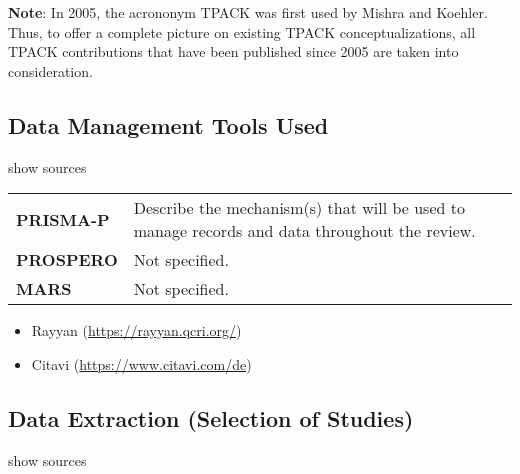 \documentclass[
]{article}
\providecommand{\tightlist}{%
  \setlength{\itemsep}{0pt}\setlength{\parskip}{0pt}}
\begin{document}
\textbf{Note}: In 2005, the acrononym TPACK was first used by Mishra and
Koehler. Thus, to offer a complete picture on existing TPACK
conceptualizations, all TPACK contributions that have been published
since 2005 are taken into consideration.

\hypertarget{data-management-tools-used}{%
\subsection{Data Management Tools
Used}\label{data-management-tools-used}}

show sources

\hypertarget{dmtu}{}
\begin{collapse}

\begin{table}[H]
\centering
\begin{tabular}{>{}l|l}
\hline
\cellcolor[HTML]{ececec}{source} & \cellcolor[HTML]{ececec}{description}\\
\hline
\textbf{PRISMA-P} & Describe the mechanism(s) that will be used to manage records and data throughout the review.\\
\hline
\textbf{PROSPERO} & Not specified.\\
\hline
\textbf{MARS} & Not specified.\\
\hline
\end{tabular}
\end{table}

\end{collapse}

\begin{itemize}
\tightlist
\item
  Rayyan (\url{https://rayyan.qcri.org/})
\item
  Citavi (\url{https://www.citavi.com/de})
\end{itemize}

\hypertarget{data-extraction-selection-of-studies}{%
\subsection{Data Extraction (Selection of
Studies)}\label{data-extraction-selection-of-studies}}

show sources
\end{document}
